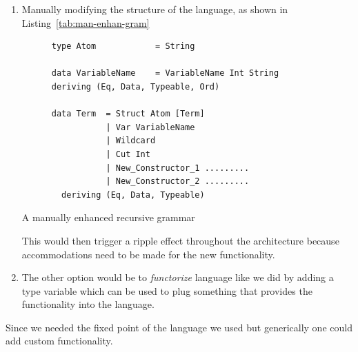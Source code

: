 \documentclass[thesis-solanki.tex]{subfiles}
\begin{document}
\begin{enumerate}
\item Manually modifying the structure of the language, as shown in Listing~\ref{tab:man-enhan-gram}
  \begin{code-list}[H]
    \begin{verbatim}
      type Atom            = String

      data VariableName    = VariableName Int String
      deriving (Eq, Data, Typeable, Ord)

      data Term  = Struct Atom [Term]
                 | Var VariableName
                 | Wildcard
                 | Cut Int
                 | New_Constructor_1 .........
                 | New_Constructor_2 .........
        deriving (Eq, Data, Typeable)
    \end{verbatim}
    \caption{A manually enhanced recursive grammar}
    \label{tab:man-enhan-gram}
  \end{code-list}

  This would then trigger a ripple effect throughout the architecture because accommodations need to be made for
  the new functionality.

\item
  The other option would be to \textit{functorize} language like we did by adding a type variable which can be used
  to plug something that provides the functionality into the language.

\end{enumerate}
Since we needed the fixed point of the language we used  but generically one could add
 custom functionality.
\end{document}
